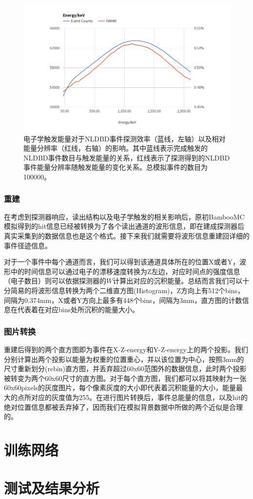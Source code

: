     \begin{figure}
        \centering
        \includegraphics[width=0.8\columnwidth]{pic/trigger_select.png}
        \caption{电子学触发能量对于NLDBD事件探测效率（蓝线，左轴）以及相对能量分辨率（红线，右轴）的影响。其中蓝线表示完成触发的NLDBD事件数目与触发能量的关系，红线表示了探测得到的NLDBD事件能量分辨率随触发能量的变化关系。总模拟事件的数目为100000。}
        \label{fig:trigger_select}
    \end{figure}

\subsubsection{重建}

    在考虑到探测器响应，读出结构以及电子学触发的相关影响后，原初BambooMC模拟得到的hit信息已经被转换为了各个读出通道的波形信息，即在建成探测器后真实采集到的数据信息也是这个格式。接下来我们就需要将波形信息重建回详细的事件径迹信息。

    对于一个事件中每个通道而言，我们可以得到该通道具体所在的位置X或者Y，波形中的时间信息可以通过电子的漂移速度转换为Z左边，对应时间点的强度信息（电子数目）则可以依据探测器的$W$计算出对应的沉积能量。总结而言我们可以十分简易的将波形信息转换为两个二维直方图(Histogram)，Z方向上有512个bins，间隔为0.374mm，X或者Y方向上最多有448个bins，间隔为3mm，直方图的计数信息在代表着在对应bins处所沉积的能量大小。

\subsubsection{图片转换}
    重建后得到的两个直方图即为事件在X-Z-energy和Y-Z-energy上的两个投影。我们分别计算出两个投影以能量为权重的位置重心，并以该位置为中心，按照3mm的尺寸重新划分(rebin)直方图，并丢弃超过60x60范围外的数据信息，此时两个投影被转变为两个60x60尺寸的直方图。对于每个直方图，我们都可以将其映射为一张60x60pixels的灰度图片，每个像素灰度的大小即代表着沉积能量的大小，能量最大的点所对应的灰度值为255。在进行图片转换后，事件总能量的信息，以及hit的绝对位置信息都被丢弃掉了，因而我们在模拟背景数据中所做的两个近似是合理的。



\section{训练网络}
\label{section:train}



\section{测试及结果分析}
\label{section:cnn_result}


